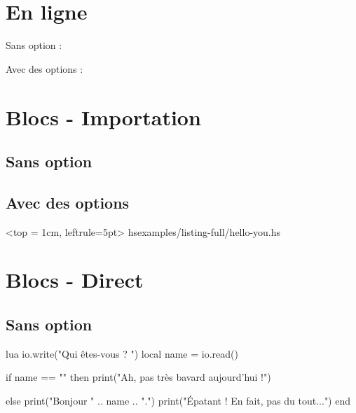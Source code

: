 \documentclass[theme = bw]{../main/main}
\begin{document}
\section{En ligne}

Sans option :




Avec des options :





\section{Blocs - Importation}

\subsection{Sans option}





\subsection{Avec des options}

\tdoccodeinput[style=solarized-light, linenos]%
              <top = 1cm, leftrule=5pt>%
              {hs}{examples/listing-full/hello-you.hs}



\section{Blocs - Direct}

\subsection{Sans option}

\begin{tdoccode}{lua}
io.write("Qui êtes-vous ? ")
local name = io.read()

if name == "" then
    print("Ah, pas très bavard aujourd'hui !")

else
    print("Bonjour " .. name .. ".")
    print("Épatant ! En fait, pas du tout...")
end
\end{tdoccode}
\end{document}
